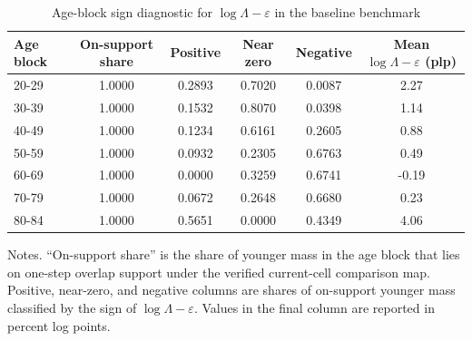 \begin{table}[t]
\centering
\caption{Age-block sign diagnostic for $\log \Lambda-\varepsilon$ in the baseline benchmark}
\label{tab:baseline-net-term-sign}
\footnotesize
\renewcommand{\arraystretch}{1.08}
\begin{tabular}{lccccc}
\toprule
Age block & On-support share & Positive & Near zero & Negative & Mean $\log\Lambda-\varepsilon$ (plp) \\
\midrule
20-29 & 1.0000 & 0.2893 & 0.7020 & 0.0087 & 2.27 \\
30-39 & 1.0000 & 0.1532 & 0.8070 & 0.0398 & 1.14 \\
40-49 & 1.0000 & 0.1234 & 0.6161 & 0.2605 & 0.88 \\
50-59 & 1.0000 & 0.0932 & 0.2305 & 0.6763 & 0.49 \\
60-69 & 1.0000 & 0.0000 & 0.3259 & 0.6741 & -0.19 \\
70-79 & 1.0000 & 0.0672 & 0.2648 & 0.6680 & 0.23 \\
80-84 & 1.0000 & 0.5651 & 0.0000 & 0.4349 & 4.06 \\
\bottomrule
\end{tabular}
\begin{minipage}{0.90\textwidth}
\footnotesize Notes. ``On-support share'' is the share of younger mass in the age block that lies on one-step overlap support under the verified current-cell comparison map. Positive, near-zero, and negative columns are shares of on-support younger mass classified by the sign of $\log\Lambda-\varepsilon$. Values in the final column are reported in percent log points.
\end{minipage}
\end{table}
